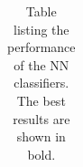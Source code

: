 \begin{table}[]
\begin{tabular}{|c|c|c|c|c|c|c|c|c|c|c|c|c|}
                     
                \end{tabular}
                \caption{Table listing the performance of the NN classifiers. The best results are shown in bold.}
                \label{tab:nn_servo}
            \end{table}
            
